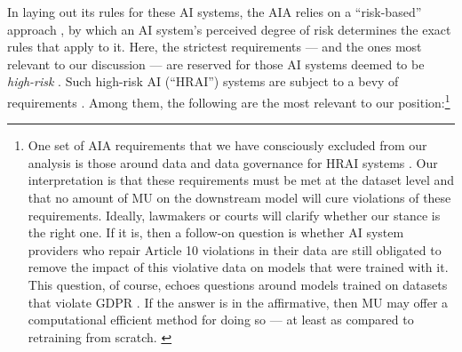 In laying out its rules for these AI systems, the AIA relies on a ``risk-based'' approach \citep{Mahler2022-gc}, by which an AI system's perceived degree of risk determines the exact rules that apply to it. Here, the strictest requirements --- and the ones most relevant to our discussion --- are reserved for those AI systems deemed to be \textit{high-risk} \citep[Art. 6]{european_union_ai_act_2024}. 
Such high-risk AI (``HRAI'') systems are subject to a bevy of requirements \citep[Chap. III]{european_union_ai_act_2024}. Among them, the following are the most relevant to our position:\footnote{One set of AIA requirements that we have consciously excluded from our analysis is those around data and data governance for HRAI systems \citep[Art. 10]{european_union_ai_act_2024}. Our interpretation is that these requirements must be met at the dataset level and that no amount of MU on the downstream model will cure violations of these requirements. Ideally, lawmakers or courts will clarify whether our stance is the right one. If it is, then a follow-on question is whether AI system providers who repair Article 10 violations in their data are still obligated to remove the impact of this violative data on models that were trained with it. This question, of course, echoes questions around models trained on datasets that violate GDPR  \citep{JULIUSSEN2023105885, DBLP:conf/sp/BourtouleCCJTZL21, yang2024machinelearningmachineunlearning}. If the answer is in the affirmative, then MU may offer a computational efficient method for doing so --- at least as compared to retraining from scratch. \label{footnote2}}

